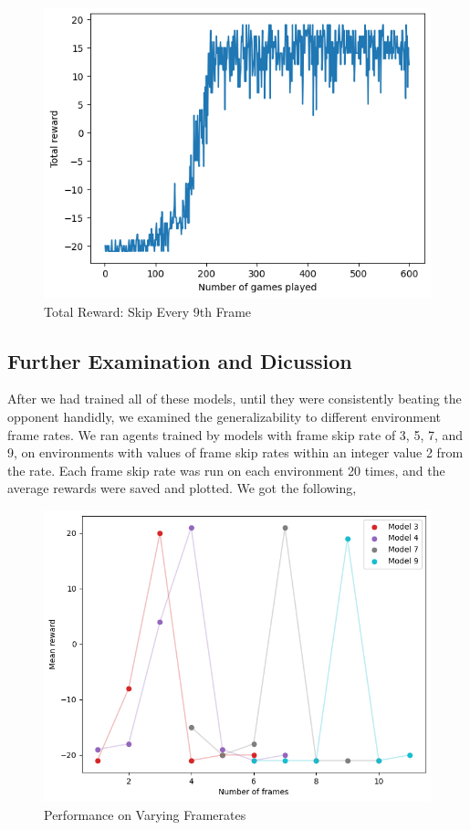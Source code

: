 \documentclass[12pt, a4paper, twocolumn]{article} %
\begin{document}
\begin{figure}[H]
	\includegraphics[width=\linewidth]{tr_sk9.PNG} %
	\caption{Total Reward: Skip Every 9th Frame} %
\end{figure}

\subsection{Further Examination and Dicussion}

After we had trained all of these models, until they were consistently beating the opponent handidly, we examined the generalizability to different environment frame rates. We ran agents trained by models with frame skip rate of 3, 5, 7, and 9, on environments with values of frame skip rates within an integer value 2 from the rate. Each frame skip rate was run on each environment 20 times, and the average rewards were saved and plotted. We got the following,

\begin{figure}[H]
	\includegraphics[width=\linewidth]{output.PNG} %
	\caption{Performance on Varying Framerates} %
\end{figure}
\end{document}
